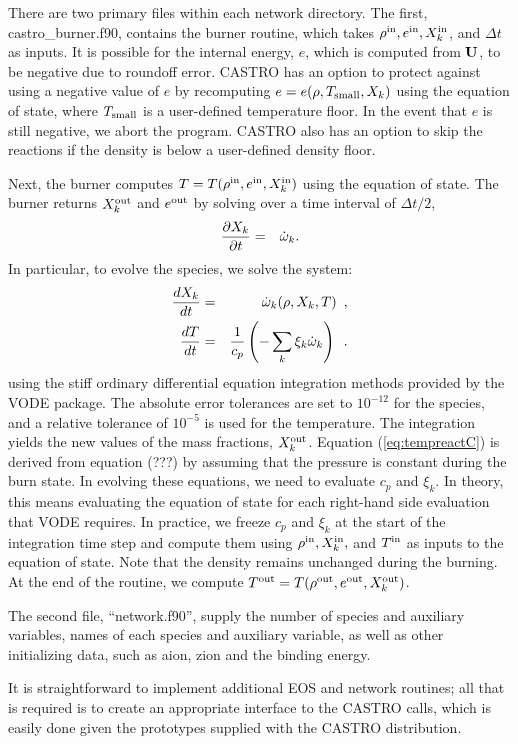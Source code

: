 There are two primary files within each network directory. The first,
castro\_burner.f90, contains the burner routine, 
which takes $\rho^{\rm in}, e^{\rm in}, X_k^{\rm in}$, and $\Delta t$ as inputs.
It is possible for the internal energy, $e$, which is computed from ${\bf U}$, to be
negative due to roundoff error.  CASTRO has an option to protect against using a 
negative value of $e$ by recomputing $e = e(\rho,T_{\rm small},X_k)$ using the 
equation of state, where $T_{\rm small}$ is a user-defined temperature floor.  In the 
event that $e$ is still negative, we abort the program.  CASTRO also has an option to
skip the reactions if the density is below a user-defined density floor.

Next, the burner computes $T = T(\rho^{\rm in},e^{\rm in},X_k^{\rm in})$ using the equation of state.
The burner returns $X_k^{\rm out}$ and $e^{\rm out}$ by solving over a time interval of $\Delta t/2$,
\begin{eqnarray}
\frac{\partial X_k}{\partial t} &=& \dot\omega_k.\\
\end{eqnarray}
In particular, to evolve the species, we solve the system:
\begin{eqnarray}
\frac{dX_k}{dt} &=& \dot\omega_k(\rho,X_k,T)\enskip, \label{eq:VODE1C} \\
\frac{dT}{dt} &=&\frac{1}{c_p} \left ( -\sum_k \xi_k  \dot\omega_k  \right )\enskip. \label{eq:tempreactC}
\end{eqnarray}
using the stiff ordinary differential equation integration methods provided by 
the VODE package.  The absolute error tolerances are set to 
$10^{-12}$ for the species, and a relative tolerance of $10^{-5}$ is used for 
the temperature.  The integration yields the new values of the mass fractions, 
$X_k^{\rm out}$.  Equation (\ref{eq:tempreactC}) is derived from equation (???) by 
assuming that the pressure is constant during the burn state.  In evolving these 
equations, we need to evaluate $c_p$ and $\xi_k$.  In theory, this means 
evaluating the equation of state for each right-hand side evaluation that 
VODE requires.  In practice, we freeze $c_p$ and $\xi_k$ at the start of 
the integration time step and compute them using $\rho^{\rm in}, X_k^{\rm in},$ and $T^{\rm in}$ 
as inputs to the equation of state.  Note that the density remains unchanged during 
the burning.  At the end of the routine, we compute 
$T^{\rm out} = T(\rho^{\rm out},e^{{\rm out}},X_k^{\rm out})$.

The second file, ``network.f90'', supply the
number of species and auxiliary variables, names of each species and 
auxiliary variable, as well as other initializing data, such as
aion, zion and the binding energy.

It is straightforward to implement additional EOS and network routines; all that is required
is to create an appropriate interface to the CASTRO calls, which is easily done given
the prototypes supplied with the CASTRO distribution.
